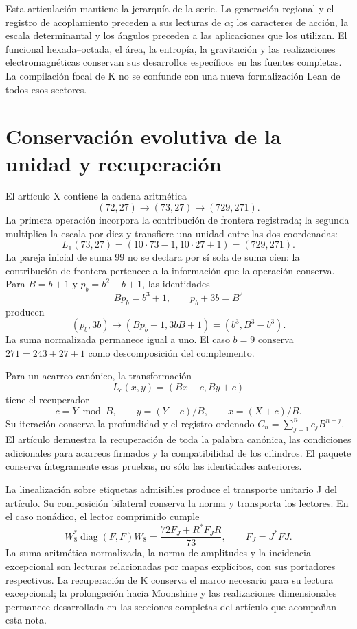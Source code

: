 \documentclass[11pt,a4paper]{article}
\begin{document}
Esta articulación mantiene la jerarquía de la serie. La generación
regional y el registro de acoplamiento preceden a sus lecturas de
$\alpha$; los caracteres de acción, la escala determinantal y los
ángulos preceden a las aplicaciones que los utilizan. El funcional
hexada--octada, el área, la entropía, la gravitación y las realizaciones
electromagnéticas conservan sus desarrollos específicos en las fuentes
completas. La compilación focal de K no se confunde con una nueva
formalización Lean de todos esos sectores.

\section{Conservación evolutiva de la unidad y recuperación}

El artículo X contiene la cadena aritmética
\[
 (72,27)\longrightarrow(73,27)\longrightarrow(729,271).
\]
La primera operación incorpora la contribución de frontera registrada;
la segunda multiplica la escala por diez y transfiere una unidad entre
las dos coordenadas:
\[
 L_1(73,27)=(10\cdot73-1,10\cdot27+1)=(729,271).
\]
La pareja inicial de suma 99 no se declara por sí sola de suma cien:
la contribución de frontera pertenece a la información que la operación
conserva. Para $B=b+1$ y $p_b=b^2-b+1$, las identidades
\[
 Bp_b=b^3+1,\qquad p_b+3b=B^2
\]
producen
\[
 (p_b,3b)\longmapsto(Bp_b-1,3bB+1)=(b^3,B^3-b^3).
\]
La suma normalizada permanece igual a uno. El caso $b=9$ conserva
$271=243+27+1$ como descomposición del complemento.

Para un acarreo canónico, la transformación
\[
 L_c(x,y)=(Bx-c,By+c)
\]
tiene el recuperador
\[
 c=Y\bmod B,\qquad y=(Y-c)/B,\qquad x=(X+c)/B.
\]
Su iteración conserva la profundidad y el registro ordenado
$C_n=\sum_{j=1}^n c_jB^{n-j}$. El artículo demuestra la recuperación de
toda la palabra canónica, las condiciones adicionales para acarreos
firmados y la compatibilidad de los cilindros. El paquete conserva
íntegramente esas pruebas, no sólo las identidades anteriores.

La linealización sobre etiquetas admisibles produce el transporte
unitario J del artículo. Su composición bilateral conserva la norma y
transporta los lectores. En el caso nonádico, el lector comprimido cumple
\[
 W_8^*\operatorname{diag}(F,F)W_8
 =\frac{72F_J+R^*F_JR}{73},\qquad F_J=J^*FJ.
\]
La suma aritmética normalizada, la norma de amplitudes y la incidencia
excepcional son lecturas relacionadas por mapas explícitos, con sus
portadores respectivos. La recuperación de K conserva el marco necesario
para su lectura excepcional; la prolongación hacia Moonshine y las
realizaciones dimensionales permanece desarrollada en las secciones
completas del artículo que acompañan esta nota.
\end{document}

